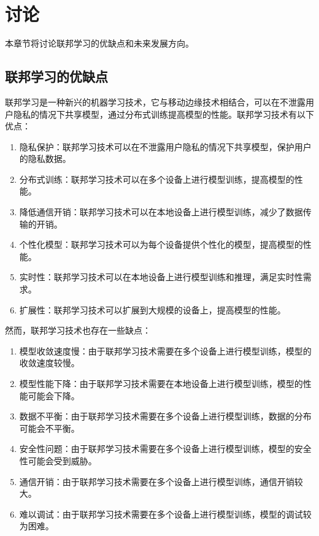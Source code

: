 \section{讨论}

本章节将讨论联邦学习的优缺点和未来发展方向。

\subsection{联邦学习的优缺点}

联邦学习是一种新兴的机器学习技术，它与移动边缘技术相结合，可以在不泄露用户隐私的情况下共享模型，通过分布式训练提高模型的性能。联邦学习技术有以下优点：

\begin{enumerate}
    \item 隐私保护：联邦学习技术可以在不泄露用户隐私的情况下共享模型，保护用户的隐私数据。
    \item 分布式训练：联邦学习技术可以在多个设备上进行模型训练，提高模型的性能。
    \item 降低通信开销：联邦学习技术可以在本地设备上进行模型训练，减少了数据传输的开销。
    \item 个性化模型：联邦学习技术可以为每个设备提供个性化的模型，提高模型的性能。
    \item 实时性：联邦学习技术可以在本地设备上进行模型训练和推理，满足实时性需求。
    \item 扩展性：联邦学习技术可以扩展到大规模的设备上，提高模型的性能。
\end{enumerate}

然而，联邦学习技术也存在一些缺点：

\begin{enumerate}
    \item 模型收敛速度慢：由于联邦学习技术需要在多个设备上进行模型训练，模型的收敛速度较慢。
    \item 模型性能下降：由于联邦学习技术需要在本地设备上进行模型训练，模型的性能可能会下降。
    \item 数据不平衡：由于联邦学习技术需要在多个设备上进行模型训练，数据的分布可能会不平衡。
    \item 安全性问题：由于联邦学习技术需要在多个设备上进行模型训练，模型的安全性可能会受到威胁。
    \item 通信开销：由于联邦学习技术需要在多个设备上进行模型训练，通信开销较大。
    \item 难以调试：由于联邦学习技术需要在多个设备上进行模型训练，模型的调试较为困难。
\end{enumerate}

